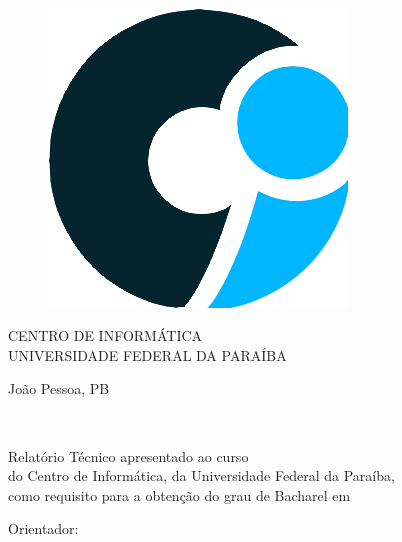 \documentclass{tcc}
\begin{document}
\pagestyle{empty} %


\begin{center}
\LARGE{\bf \thetitle}\\
\end{center}

\vspace{1em}

\begin{center}
\theauthor
\end{center}

\vfill


\begin{figure}[H]
\centering
\includegraphics[width=0.18\linewidth]{imagens/logo_ci.png}
\end{figure}

\begin{center}
CENTRO DE INFORMÁTICA \\
UNIVERSIDADE FEDERAL DA PARAÍBA

\end{center}

\vspace{2in}

\begin{center}
João Pessoa, PB

\the\year
\end{center}
\afterpage{ \addtocounter{page}{1}} %

\newpage
\begin{center}
\theauthor
\end{center}
\vspace{3in}
\begin{center}
\LARGE{\thetitle}\\
\end{center}

\vspace{2in}

\begin{flushright}
Relatório Técnico apresentado ao curso \nomedocurso \\ do Centro de Informática, da Universidade Federal da Paraíba, \\ como requisito para a obtenção do grau de Bacharel em \nomedocurso
\\
\vspace{0.2in}

Orientador: \orientador


\end{flushright}
\end{document}
